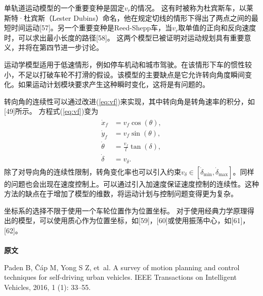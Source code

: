 单轨道运动模型的一个重要变种是固定$v_r$的情况。 这有时被称为杜宾斯车，以莱斯特·杜宾斯（Lester Dubins）命名，他在规定切线的情形下得出了两点之间的最短时间运动[57]。另一个重要变种是Reed-Shepp车，当$v_r$取单值的正向和反向速度时，可以求出最小长度的路径[58]。 这两个模型已被证明对运动规划具有重要意义，并将在第四节进一步讨论。

运动学模型适用于低速情形，例如停车机动和城市驾驶。在该情形下车的惯性较小，不足以打破车轮不打滑的假设。该模型的主要缺点是它允许转向角度瞬间变化。如果运动计划模块要求产生这种瞬时变化，这将是有问题的。

转向角的连续性可以通过改进(\ref{eq:vf})来实现，其中转向角是转角速率的积分，如[49]所示。 方程式(\ref{eq:vf})变为
\begin{align}
\begin{split}
\dot{x}_f&= v_f\cos(\theta),\\
\dot{y}_f&= v_f\sin(\theta),\\
\dot{\theta}&=\frac{v_f}{l}\tan(\delta),\\
\dot{\delta}&=v_{\delta}.
\end{split}
\end{align}
除了对导向角的连续性限制，转角变化率也可以引入约束$v_{\delta}\in [\dot{\delta}_{\min},\dot{\delta}_{\max}]$。同样的问题也会出现在速度控制上。可以通过引入加速度保证速度控制的连续性。这种方法的缺点在于增加了模型的维数，将运动计划与控制问题变得更为复杂。

坐标系的选择不限于使用一个车轮位置作为位置坐标。 对于使用经典力学原理得出的模型，可以使用质心作为位置坐标，如[59]，[60]或使用振荡中心，如[61]，[62]。\\\\

\textbf{原文}
\begin{translationbib}[label=]
\item Paden B, {\v{C}}{\'a}p M, Yong S Z, et~al.
\newblock A survey of motion planning and control techniques for self-driving
  urban vehicles\allowbreak[J].
\newblock IEEE Transactions on Intelligent Vehicles, 2016, 1 (1):
  33--55.
\end{translationbib}